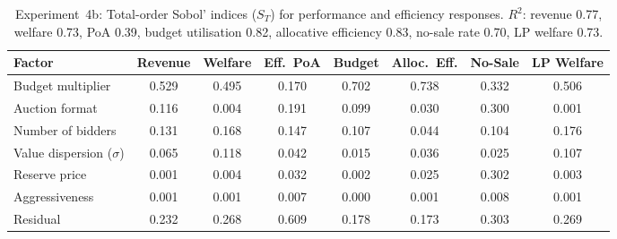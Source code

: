 \begin{table}[H]
\centering
\caption{Experiment~4b: Total-order Sobol' indices ($S_T$) for performance and efficiency responses. $R^2$: revenue 0.77, welfare 0.73, PoA 0.39, budget utilisation 0.82, allocative efficiency 0.83, no-sale rate 0.70, LP welfare 0.73.}
\label{tab:sens_exp4b_primary}
\small
\begin{tabular}{l ccccccc}
\toprule
Factor & Revenue & Welfare & Eff.\ PoA & Budget & Alloc.\ Eff. & No-Sale & LP Welfare \\
\midrule
Budget multiplier         & 0.529 & 0.495 & 0.170 & 0.702 & 0.738 & 0.332 & 0.506 \\
Auction format            & 0.116 & 0.004 & 0.191 & 0.099 & 0.030 & 0.300 & 0.001 \\
Number of bidders         & 0.131 & 0.168 & 0.147 & 0.107 & 0.044 & 0.104 & 0.176 \\
Value dispersion ($\sigma$) & 0.065 & 0.118 & 0.042 & 0.015 & 0.036 & 0.025 & 0.107 \\
Reserve price             & 0.001 & 0.004 & 0.032 & 0.002 & 0.025 & 0.302 & 0.003 \\
Aggressiveness            & 0.001 & 0.001 & 0.007 & 0.000 & 0.001 & 0.008 & 0.001 \\
\midrule
Residual                  & 0.232 & 0.268 & 0.609 & 0.178 & 0.173 & 0.303 & 0.269 \\
\bottomrule
\end{tabular}
\end{table}

\begin{table}[H]
\centering
\caption{Experiment~4b: Total-order Sobol' indices ($S_T$) for stability and dynamics responses. $R^2$: pacing stability 0.88, entropy 0.80, warm start 0.03, inter-episode volatility 0.61, bid-to-value 0.89, bid suppression 0.89, cross-episode drift 0.05.}
\label{tab:sens_exp4b_secondary}
\small
{}
\end{table}

